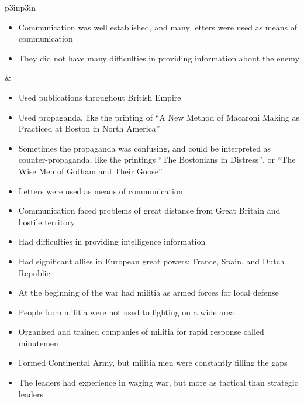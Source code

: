 \begin{singlespace}
\begin{mpxtabular}{p{3in}p{3in}}
\begin{itemize}[nolistsep,leftmargin=*]
	    \item  Communication was well established, and many letters were
	      used as means of communication \cite[167,264]{knollenberg_growth_2003}
	    \item  They did not have many difficulties in providing information
	      about the enemy \cite[63]{ladenburg_causes_1989}
	\end{itemize}
	&
	\begin{itemize}[nolistsep,leftmargin=*]
	    \item  Used publications throughout British Empire
	    \item  Used propaganda, like the printing of  “A New Method of
	      Macaroni Making as Practiced at Boston in North America”
	    \item  Sometimes the propaganda was confusing, and could be
	      interpreted as counter-propaganda, like the printings “The
	      Bostonians in Distress”, or “The Wise Men of Gotham and Their
	      Goose” \cite[168-169]{knollenberg_growth_2003}
	    \item  Letters were used as means of communication \cite[169]{knollenberg_growth_2003}
	    \item  Communication faced problems of great distance from Great Britain and hostile territory
	    \item  Had difficulties in providing intelligence information \cite[545]{mackesy1962british}
	\end{itemize}\ML
	\ML
	\begin{itemize}[nolistsep,leftmargin=*]
	    \item  Had significant allies in European great powers: France,
	      Spain, and Dutch Republic \cite[p.89]{stewart_2005} 
	    \item  At the beginning of the war had militia as armed forces for
	      local defense \cite[p.56]{stewart_2005} 
	    \item  People from militia were not used to fighting on a wide area
	      \cite[p.48]{pancake_1985} 
	    \item  Organized and trained companies of militia for rapid response
	      called minutemen \cite[p.46]{stewart_2005} 
	    \item  Formed Continental Army, but militia men were constantly
	      filling the gaps \cite[p.53]{stewart_2005} 
	    \item  The leaders had experience in waging war, but more as
	      tactical than strategic leaders
	      \cite[7]{higginbotham_daniel_1961} \cite[p.51]{stewart_2005} 

\end{itemize}
\end{mpxtabular}
\end{singlespace}
